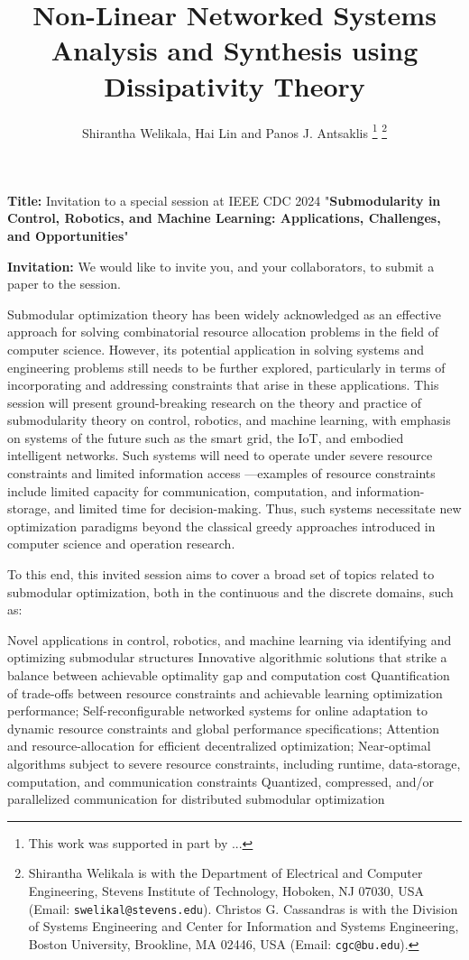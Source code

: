 \documentclass[letterpaper, 10 pt, conference]{ieeeconf}
\title{\LARGE \bf
Non-Linear Networked Systems Analysis and Synthesis using Dissipativity Theory
\vspace{-15pt}
}
\author{Shirantha Welikala, Hai Lin and Panos J. Antsaklis %
\thanks{This work was supported in part by ... }
\thanks{Shirantha Welikala is with the Department of Electrical and Computer Engineering, Stevens Institute of Technology, Hoboken, NJ 07030, USA (Email: \texttt{{\small swelikal@stevens.edu}}). Christos G. Cassandras is with the Division of Systems Engineering and Center for Information and Systems Engineering, Boston University, Brookline, MA 02446, USA (Email: \texttt{{\small cgc@bu.edu}}).}}
\begin{document}


\textbf{Title:} Invitation to a special session at IEEE CDC 2024 "\textbf{Submodularity in Control, Robotics, and Machine Learning: Applications, Challenges, and Opportunities}"

\textbf{Invitation:} We would like to invite you, and your collaborators, to submit a paper to the session.   

Submodular optimization theory has been widely acknowledged as an effective approach for solving combinatorial resource allocation problems in the field of computer science. However, its potential application in solving systems and engineering problems still needs to be further explored, particularly in terms of incorporating and addressing constraints that arise in these applications. This session will present ground-breaking research on the theory and practice of submodularity theory on control, robotics, and machine learning, with emphasis on systems of the future such as the smart grid, the IoT, and embodied intelligent networks.  Such systems will need to operate under severe resource constraints and limited information access —examples of resource constraints include limited capacity for communication, computation, and information- storage, and limited time for decision-making.  Thus, such systems necessitate new optimization paradigms beyond the classical greedy approaches introduced in computer science and operation research.  

To this end, this invited session aims to cover a broad set of topics related to submodular optimization, both in the continuous and the discrete domains, such as:

Novel applications in control, robotics, and machine learning via identifying and optimizing submodular structures
Innovative algorithmic solutions that strike a balance between achievable optimality gap and computation cost 
Quantification of trade-offs between resource constraints and achievable learning optimization performance;                                         
Self-reconfigurable networked systems for online adaptation to dynamic resource constraints and global performance specifications;                                       
Attention and resource-allocation for efficient decentralized optimization;
Near-optimal algorithms subject to severe resource constraints, including runtime, data-storage, computation, and communication constraints
Quantized, compressed, and/or parallelized communication for distributed submodular optimization 
 
\end{document}
